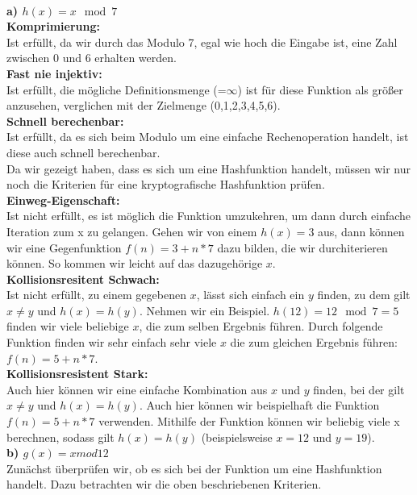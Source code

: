 \documentclass[german]{../uebung}
\begin{document}
\begin{exercise}{1}
\begin{figure}[h]
    \end{figure}\\
    \textbf{a) \(h(x) = x \mod 7\)}\\
    \textbf{Komprimierung:}\\
    Ist erfüllt, da wir durch das Modulo 7, egal wie hoch die Eingabe ist, eine Zahl zwischen 0 und 6 erhalten werden.\\
    \textbf{Fast nie injektiv:}\\
    Ist erfüllt, die mögliche Definitionsmenge (=\(\infty\)) ist für diese Funktion als größer anzusehen, verglichen mit der Zielmenge (0,1,2,3,4,5,6).\\
    \textbf{Schnell berechenbar:}\\
    Ist erfüllt, da es sich beim Modulo um eine einfache Rechenoperation handelt, ist diese auch schnell berechenbar.\\
    Da wir gezeigt haben, dass es sich um eine Hashfunktion handelt, müssen wir nur noch die Kriterien für eine kryptografische Hashfunktion prüfen.\\
    \textbf{Einweg-Eigenschaft:}\\
    Ist nicht erfüllt, es ist möglich die Funktion umzukehren, um dann durch einfache Iteration zum x zu gelangen. Gehen wir von einem \(h(x)=3\) aus, dann können wir eine Gegenfunktion \(f(n)=3+n*7\) dazu bilden, die wir durchiterieren können. So kommen wir leicht auf das dazugehörige \(x\).\\
    \textbf{Kollisionsresitent Schwach:}\\
    Ist nicht erfüllt, zu einem gegebenen \(x\), lässt sich einfach ein \(y\) finden, zu dem gilt \(x \neq y\) und \(h(x)=h(y)\). Nehmen wir ein Beispiel. \(h(12)=12 \mod 7= 5\) finden wir viele beliebige \(x\), die zum selben Ergebnis führen. Durch folgende Funktion finden wir sehr einfach sehr viele \(x\) die zum gleichen Ergebnis führen: \(f(n)=5+n*7\).\\
    \textbf{Kollisionsresistent Stark:}\\
    Auch hier können wir eine einfache Kombination aus \(x\) und \(y\) finden, bei der gilt \(x \neq y\) und \(h(x)=h(y)\). Auch hier können wir beispielhaft die Funktion \(f(n)=5+n*7\) verwenden. Mithilfe der Funktion können wir beliebig viele x berechnen, sodass gilt \(h(x)=h(y)\) (beispielsweise \(x=12\) und \(y=19\)).\\
    \textbf{b) \(g(x) = x mod 12\)}\\
    Zunächst überprüfen wir, ob es sich bei der Funktion um eine Hashfunktion handelt. Dazu betrachten wir die oben beschriebenen Kriterien.\\

\end{exercise}
\end{document}
